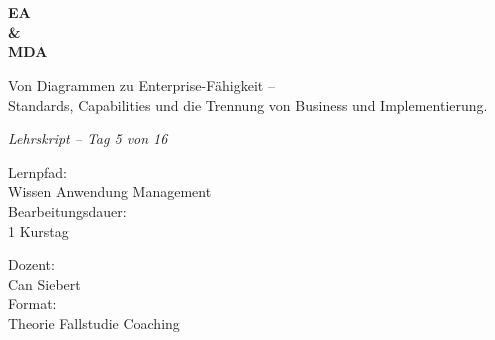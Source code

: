 \documentclass[11pt,a4paper,oneside]{article}
\newcommand{\caveatfontfallback}{\itshape}
\newcommand\caveatfont{\caveatfontfallback}%
\begin{document}
\begin{titlepage}
  \pagestyle{empty}
  \vspace*{1.5cm}
  \\[2pt]
  \noindent{\color{lpAccent}\rule{\linewidth}{1.2pt}}\\[4pt]

  \vspace{3cm}
  {\sffamily\fontsize{30}{34}\selectfont\bfseries\color{lpInk}EA\\\&\\MDA\par}

  \vspace{0.7cm}
  {\sffamily\large\color{lpGray}Von Diagrammen zu Enterprise-Fähigkeit --\\Standards, Capabilities und die Trennung von Business und Implementierung.\par}

  \vspace{1.5cm}
  {\caveatfont\LARGE\color{lpAmber}Lehrskript -- Tag 5 von 16}\par

  \vfill

  \noindent\begin{minipage}{0.55\linewidth}
    {\sffamily\footnotesize\color{lpGray}Lernpfad:}\\
    {\sffamily\small\color{lpInk}Wissen \textrightarrow{} Anwendung \textrightarrow{} Management}\\[10pt]
    {\sffamily\footnotesize\color{lpGray}Bearbeitungsdauer:}\\
    {\sffamily\small\color{lpInk}1 Kurstag}
  \end{minipage}\hfill
  \begin{minipage}{0.4\linewidth}
    \raggedleft
    {\sffamily\footnotesize\color{lpGray}Dozent:}\\
    {\sffamily\small\color{lpInk}Can Siebert}\\[10pt]
    {\sffamily\footnotesize\color{lpGray}Format:}\\
    {\sffamily\small\color{lpInk}Theorie \textperiodcentered{} Fallstudie \textperiodcentered{} Coaching}
  \end{minipage}

  \vspace{0.5cm}
  \noindent{\color{lpAccent}\rule{\linewidth}{0.6pt}}
\end{titlepage}
\end{document}
